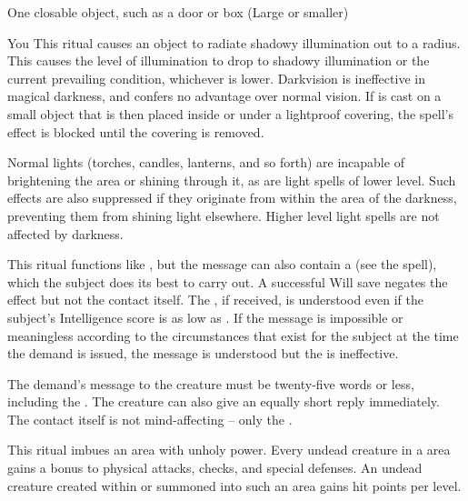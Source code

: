 \begin{spelltarget}{One closable object, such as a door or box (Large or smaller)}
\begin{spelltarget}{You}
\spelldur{\durlong \dismissable}
\spelleffect This ritual causes an object to radiate shadowy illumination out to a \areamed radius. This causes the level of illumination to drop to shadowy illumination or the current prevailing condition, whichever is lower. Darkvision is ineffective in magical darkness, and confers no advantage over normal vision.
\spellnotes If  is cast on a small object that is then placed inside or under a lightproof covering, the spell's effect is blocked until the covering is removed.

Normal lights (torches, candles, lanterns, and so forth) are incapable of brightening the area or shining through it, as are light spells of lower level. Such effects are also suppressed if they originate from within the area of the darkness, preventing them from shining light elsewhere. Higher level light spells are not affected by darkness.

\spelleffect This ritual functions like , but the message can also contain a  (see the  spell), which the subject does its best to carry out. A successful Will save negates the  effect but not the contact itself. The , if received, is understood even if the subject's Intelligence score is as low as . If the message is impossible or meaningless according to the circumstances that exist for the subject at the time the demand is issued, the message is understood but the  is ineffective.
\par The demand's message to the creature must be twenty-five words or less, including the . The creature can also give an equally short reply immediately.
\spellnotes The contact itself is not mind-affecting -- only the .

\spelleffect This ritual imbues an area with unholy power. Every undead creature in a  area gains a  bonus to physical attacks, checks, and special defenses. An undead creature created within or summoned into such an area gains  hit points per level.


\end{spelltarget}
\end{spelltarget}
